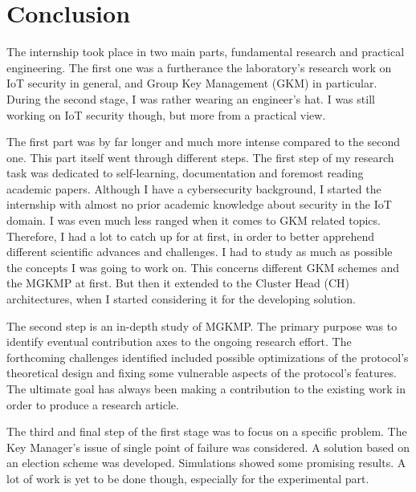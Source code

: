\chapter*{Conclusion}

The internship took place in two main parts, fundamental research and practical engineering. The first one was a furtherance the laboratory's research work on IoT security in general, and Group Key Management (GKM) in particular. During the second stage, I was rather wearing an engineer's hat. I was still working on IoT security though, but more from a practical view.

The first part was by far longer and much more intense compared to the second one. This part itself went through different steps. The first step of my research task was dedicated to self-learning, documentation and foremost reading academic papers. Although I have a cybersecurity background, I started the internship with almost no prior academic knowledge about security in the IoT domain. I was even much less ranged when it comes to GKM related topics. Therefore, I had a lot to catch up for at first, in order to better apprehend different scientific advances and challenges. I had to study as much as possible the concepts I was going to work on. This concerns different GKM schemes and the MGKMP at first. But then it extended to the Cluster Head (CH) architectures, when I started considering it for the developing solution. 

The second step is an in-depth study of MGKMP. The primary purpose was to identify eventual contribution axes to the ongoing research effort. The forthcoming challenges identified included possible optimizations of the protocol's theoretical design and fixing some vulnerable aspects of the protocol's features. The ultimate goal has always been making a contribution to the existing work in order to produce a research article.

The third and final step of the first stage was to focus on a specific problem. The Key Manager's issue of single point of failure was considered. A solution based on an election scheme was developed. Simulations showed some promising results. A lot of work is yet to be done though, especially for the experimental part.

